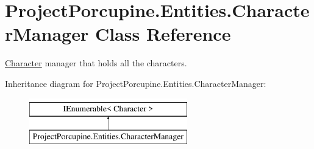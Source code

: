 \hypertarget{class_project_porcupine_1_1_entities_1_1_character_manager}{}\section{Project\+Porcupine.\+Entities.\+Character\+Manager Class Reference}
\label{class_project_porcupine_1_1_entities_1_1_character_manager}


\hyperlink{class_project_porcupine_1_1_entities_1_1_character}{Character} manager that holds all the characters.  


Inheritance diagram for Project\+Porcupine.\+Entities.\+Character\+Manager\+:\begin{figure}[H]
\begin{center}
\leavevmode
\includegraphics[height=2.000000cm]{class_project_porcupine_1_1_entities_1_1_character_manager}
\end{center}
\end{figure}
